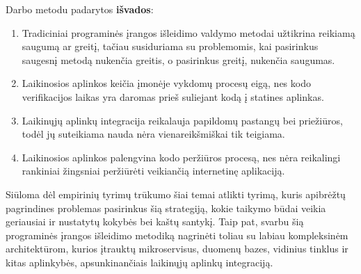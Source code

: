 \documentclass{VUMIFPSkursinis}
\begin{document}
Darbo metodu padarytos \textbf{išvados}:

\begin{enumerate}
  \item Tradiciniai programinės įrangos išleidimo valdymo metodai užtikrina reikiamą saugumą ar greitį, tačiau susiduriama su problemomis, kai pasirinkus saugesnį metodą nukenčia greitis, o pasirinkus greitį, nukenčia saugumas.
  \item Laikinosios aplinkos keičia įmonėje vykdomų procesų eigą, nes kodo verifikacijos laikas yra daromas prieš suliejant kodą į statines aplinkas.
  \item Laikinųjų aplinkų integracija reikalauja papildomų pastangų bei priežiūros, todėl jų suteikiama nauda nėra vienareikšmiškai tik teigiama.
  \item Laikinosios aplinkos palengvina kodo peržiūros procesą, nes nėra reikalingi rankiniai žingsniai peržiūrėti veikiančią internetinę aplikaciją.
\end{enumerate} 

 
Siūloma dėl empirinių tyrimų trūkumo šiai temai atlikti tyrimą, kuris apibrėžtų pagrindines problemas pasirinkus šią strategiją, kokie taikymo būdai veikia geriausiai ir nustatytų kokybės bei kaštų santykį. Taip pat, svarbu šią programinės įrangos išleidimo metodiką nagrinėti toliau su labiau kompleksinėm architektūrom, kurios įtrauktų mikroservisus, duomenų bazes, vidinius tinklus ir kitas aplinkybės, apsunkinančiais laikinųjų aplinkų integraciją.

\printbibliography[heading=bibintoc,category=cited] %


\appendix  %
\end{document}
